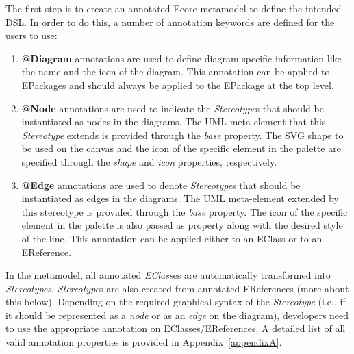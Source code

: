 The first step is to create an annotated Ecore metamodel to define the intended DSL.
In order to do this, a number of annotation keywords are defined for the users to use:

\begin{enumerate}[label=\arabic*.]
	\item \textbf{@Diagram} annotations are used to define diagram-specific information like the name and the icon of the diagram. This annotation can be applied to EPackages and should always be applied to the EPackage at the top level.
	\item \textbf{@Node} annotations are used to indicate the \textit{Stereotype}s that should be instantiated as nodes in the diagrams. 
	The UML meta-element that this \textit{Stereotype} extends is provided through the \emph{base} property. 
	The SVG shape to be used on the canvas and the icon of the specific element in the palette are specified through the \emph{shape} and \emph{icon} properties, respectively. 
	\item \textbf{@Edge} annotations are used to denote \textit{Stereotype}s that should be instantiated as edges in the diagrams. 
	The UML meta-element extended by this stereotype is provided through the \emph{base} property. The icon of the specific element in the palette is also passed as property along with the desired style of the line. 
	This annotation can be applied either to an EClass or to an EReference.
\end{enumerate}

In the metamodel, all annotated \textit{EClass}es are automatically transformed into \textit{Stereotypes}.
\textit{Stereotype}s are also created from annotated EReferences (more about this below). 
Depending on the required graphical syntax of the \textit{Stereotype} (i.e., if it should be represented as a \textit{node} or as an \textit{edge} on the diagram), developers need to use the appropriate annotation on EClasses/EReferences. 
A detailed list of all valid annotation properties is provided in Appendix~\ref{appendixA}. 

